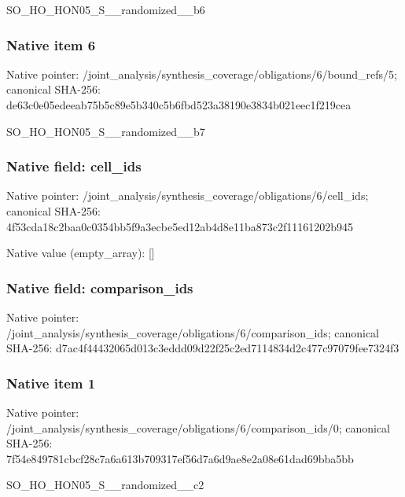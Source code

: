 \documentclass[10pt,a4paper]{article}
\begin{document}
\begingroup\raggedright\sloppy SO\_\allowbreak{}HO\_\allowbreak{}HON05\_\allowbreak{}S\_\allowbreak{}\_\allowbreak{}randomized\_\allowbreak{}\_\allowbreak{}b6\par\endgroup

\subsubsection{Native item 6}
Native pointer: /joint\_\allowbreak{}analysis/synthesis\_\allowbreak{}coverage/obligations/6/bound\_\allowbreak{}refs/5; canonical SHA-256: de63c0e05edeeab75b5c89e5b340c5b6fbd523a38190e3834b021eec1f219cea

\begingroup\raggedright\sloppy SO\_\allowbreak{}HO\_\allowbreak{}HON05\_\allowbreak{}S\_\allowbreak{}\_\allowbreak{}randomized\_\allowbreak{}\_\allowbreak{}b7\par\endgroup

\subsubsection{Native field: cell\_\allowbreak{}ids}
Native pointer: /joint\_\allowbreak{}analysis/synthesis\_\allowbreak{}coverage/obligations/6/cell\_\allowbreak{}ids; canonical SHA-256: 4f53cda18c2baa0c0354bb5f9a3ecbe5ed12ab4d8e11ba873c2f11161202b945

Native value (empty\_\allowbreak{}array): []

\subsubsection{Native field: comparison\_\allowbreak{}ids}
Native pointer: /joint\_\allowbreak{}analysis/synthesis\_\allowbreak{}coverage/obligations/6/comparison\_\allowbreak{}ids; canonical SHA-256: d7ac4f44432065d013c3eddd09d22f25c2ed7114834d2c477c97079fee7324f3

\subsubsection{Native item 1}
Native pointer: /joint\_\allowbreak{}analysis/synthesis\_\allowbreak{}coverage/obligations/6/comparison\_\allowbreak{}ids/0; canonical SHA-256: 7f54e849781cbcf28c7a6a613b709317ef56d7a6d9ae8e2a08e61dad69bba5bb

\begingroup\raggedright\sloppy SO\_\allowbreak{}HO\_\allowbreak{}HON05\_\allowbreak{}S\_\allowbreak{}\_\allowbreak{}randomized\_\allowbreak{}\_\allowbreak{}c2\par\endgroup
\end{document}
